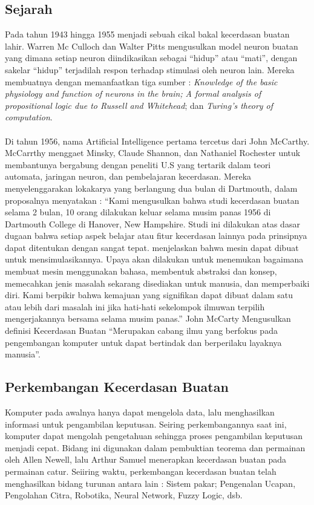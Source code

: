 \subsection{Sejarah}
Pada tahun 1943 hingga 1955 menjadi sebuah cikal bakal kecerdasan buatan lahir. Warren Mc Culloch dan Walter Pitts mengusulkan model neuron buatan yang dimana setiap neuron diindikasikan sebagai “hidup” atau “mati”, dengan sakelar “hidup” terjadilah respon terhadap stimulasi oleh neuron lain. Mereka membuatnya dengan memanfaatkan tiga sumber : \textit{Knowledge of the basic physiology and function of neurons in the brain;} \textit{A formal analysis of propositional logic due to Russell and Whitehead}; dan \textit{Turing’s theory of computation}.
\\
\\
Di tahun 1956, nama Artificial Intelligence pertama tercetus dari John McCarthy. McCarrthy menggaet Minsky, Claude Shannon, dan Nathaniel Rochester untuk membantunya bergabung dengan  peneliti U.S yang tertarik dalam teori automata, jaringan neuron, dan pembelajaran kecerdasan.  Mereka menyelenggarakan lokakarya yang berlangung dua bulan di Dartmouth, dalam proposalnya menyatakan : 
“Kami mengusulkan bahwa studi kecerdasan buatan selama 2 bulan, 10 orang dilakukan keluar selama musim panas 1956 di Dartmouth College di Hanover, New Hampshire. Studi ini dilakukan atas dasar dugaan bahwa setiap aspek belajar atau fitur kecerdasan lainnya pada prinsipnya dapat ditentukan dengan sangat tepat. menjelaskan bahwa mesin dapat dibuat untuk mensimulasikannya. Upaya akan dilakukan untuk menemukan bagaimana membuat mesin menggunakan bahasa, membentuk abstraksi dan konsep, memecahkan jenis masalah sekarang disediakan untuk manusia, dan memperbaiki diri. Kami berpikir bahwa kemajuan yang signifikan dapat dibuat dalam satu atau lebih dari masalah ini jika hati-hati sekelompok ilmuwan terpilih mengerjakannya bersama selama musim panas.”
John McCarty Mengusulkan definisi Kecerdasan Buatan “Merupakan cabang ilmu yang berfokus pada pengembangan komputer untuk dapat bertindak dan berperilaku layaknya manusia”.\cite{russell2009artificial}
\\
\subsection{Perkembangan Kecerdasan Buatan}
Komputer pada awalnya hanya dapat mengelola data, lalu menghasilkan informasi untuk pengambilan keputusan. Seiring perkembangannya saat ini, komputer dapat mengolah pengetahuan sehingga proses pengambilan keputusan menjadi cepat. Bidang ini digunakan dalam pembuktian teorema dan permainan oleh Allen Newell, lalu Arthur Samuel menerapkan kecerdasan buatan pada permainan catur. Seiiring waktu, perkembangan kecerdasan buatan telah menghasilkan bidang turunan antara lain : Sistem pakar; Pengenalan Ucapan, Pengolahan Citra, Robotika, Neural Network, Fuzzy Logic, dsb.\cite{kb13vic}
\\
